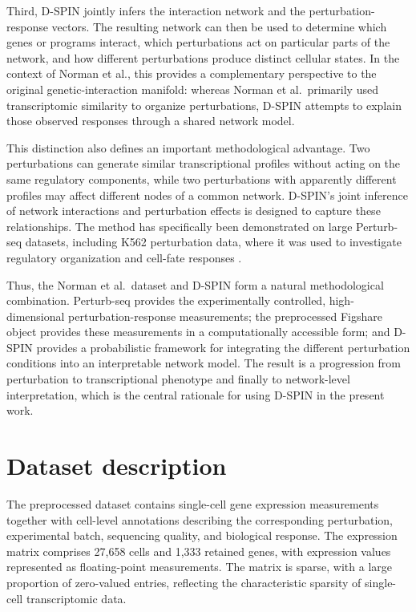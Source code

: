 \documentclass[11pt,a4paper]{article}
\begin{document}
Third, D-SPIN jointly infers the interaction network and the
perturbation-response vectors. The resulting network can then be
used to determine which genes or programs interact, which perturbations act
on particular parts of the network, and how different perturbations produce
distinct cellular states. In the context of Norman et al., this provides a
complementary perspective to the original genetic-interaction manifold:
whereas Norman et al.\ primarily used transcriptomic similarity to organize
perturbations, D-SPIN attempts to explain those observed responses through a
shared network model.

This distinction also defines an important methodological advantage. Two
perturbations can generate similar transcriptional profiles without acting on
the same regulatory components, while two perturbations with apparently
different profiles may affect different nodes of a common network. D-SPIN's
joint inference of network interactions and perturbation effects is designed
to capture these relationships. The method has specifically been demonstrated
on large Perturb-seq datasets, including K562 perturbation data, where it was
used to investigate regulatory organization and cell-fate responses
\cite{jiang2023dspin}.

Thus, the Norman et al.\ dataset and D-SPIN form a natural methodological
combination. Perturb-seq provides the experimentally controlled,
high-dimensional perturbation-response measurements; the preprocessed
Figshare object provides these measurements in a computationally accessible
form; and D-SPIN provides a probabilistic framework for integrating the
different perturbation conditions into an interpretable network model. The
result is a progression from perturbation to transcriptional
	phenotype and finally to network-level interpretation, which is the
central rationale for using D-SPIN in the present work.

\newpage

\section{Dataset description}

The preprocessed dataset contains single-cell gene expression measurements together with cell-level annotations describing the corresponding perturbation, experimental batch, sequencing quality, and biological response. The expression matrix comprises 27,658 cells and 1,333 retained genes, with expression values represented as floating-point measurements. The matrix is sparse, with a large proportion of zero-valued entries, reflecting the characteristic sparsity of single-cell transcriptomic data.
\end{document}

